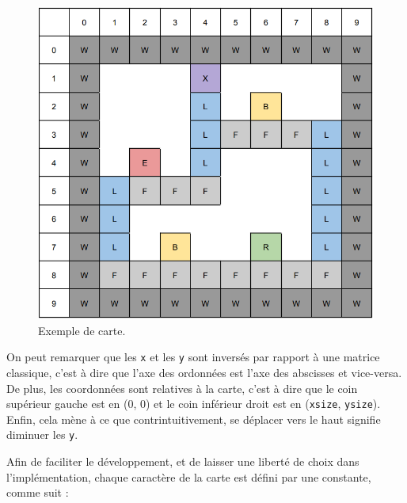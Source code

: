 \begin{figure}[!htpb]
    \centering
    \includegraphics[width=\linewidth]{Figures/map1.png}
    \caption[Exemple de carte.]{Exemple de carte.}
    \label{fig:map1}
\end{figure}

\newpage

On peut remarquer que les \texttt{x} et les \texttt{y} sont inversés par rapport à une matrice classique, c'est à dire que l'axe des ordonnées est l'axe des abscisses et vice-versa.
De plus, les coordonnées sont relatives à la carte, c'est à dire que le coin supérieur gauche est en (0, 0) et le coin inférieur droit est en (\texttt{xsize}, \texttt{ysize}).
Enfin, cela mène à ce que contrintuitivement, se déplacer vers le haut signifie diminuer les \texttt{y}.

Afin de faciliter le développement, et de laisser une liberté de choix dans l'implémentation, chaque caractère de la carte est défini par une constante, comme suit :

